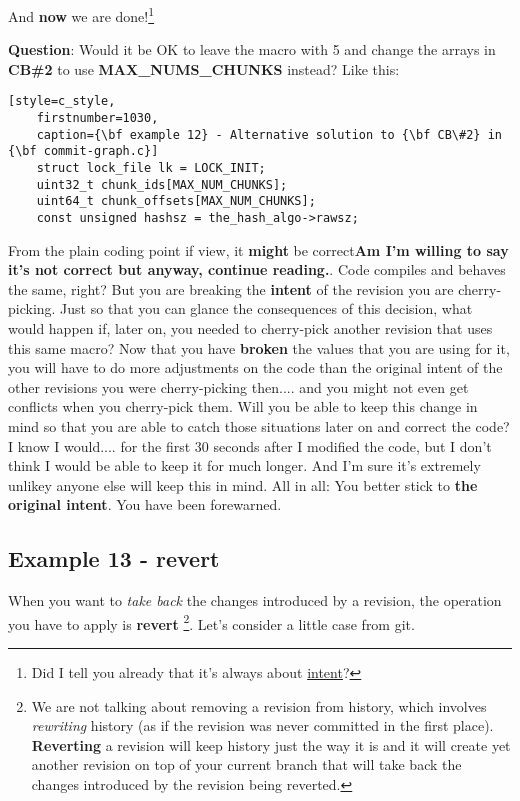 And {\bf now} we are done!\footnote{Did I tell you already that it's always about \hyperref[intent]{intent}?}

{\bf Question}: Would it be OK to leave the macro with 5 and change the arrays in {\bf CB\#2} to use {\bf MAX\_NUMS\_CHUNKS} instead?
Like this:

\begin{lstlisting}[style=c_style,
	firstnumber=1030,
	caption={\bf example 12} - Alternative solution to {\bf CB\#2} in {\bf commit-graph.c}]
	struct lock_file lk = LOCK_INIT;
	uint32_t chunk_ids[MAX_NUM_CHUNKS];
	uint64_t chunk_offsets[MAX_NUM_CHUNKS];
	const unsigned hashsz = the_hash_algo->rawsz;
\end{lstlisting}

From the plain coding point if view, it {\bf might} be correct{\bf Am I'm willing to say it's not correct but anyway, continue reading.}.
Code compiles and behaves the same, right? But you are breaking the {\bf intent} of the revision you are cherry-picking. Just so that you
can glance the consequences of this decision, what would happen if, later on, you needed to cherry-pick another revision that uses this
same macro? Now that you have {\bf broken} the values that you are using for it, you will have to do more adjustments on the code than
the original intent of the other revisions you were cherry-picking then.... and you might not even get conflicts when you cherry-pick
them. Will you be able to keep this change in mind so that you are able to catch those situations later on and correct the code?
I know I would.... for the first 30 seconds after I modified the code, but I don't think I would be able to keep it for much longer.
And I'm sure it's extremely unlikey anyone else will keep this in mind. All in all: You better stick to {\bf the original intent}.
You have been forewarned.

\subsection{Example 13 - revert}
\label{example_13}

When you want to {\it take back} the changes introduced by a revision, the operation you have to apply is {\bf revert}
\footnote{We are not talking about removing a revision from history, which involves {\it rewriting} history (as if the revision
was never committed in the first place). {\bf Reverting} a revision will keep history just the way it is and it will create yet
another revision on top of your current branch that will take back the changes introduced by the revision being reverted.}. Let's
consider a little case from git.

